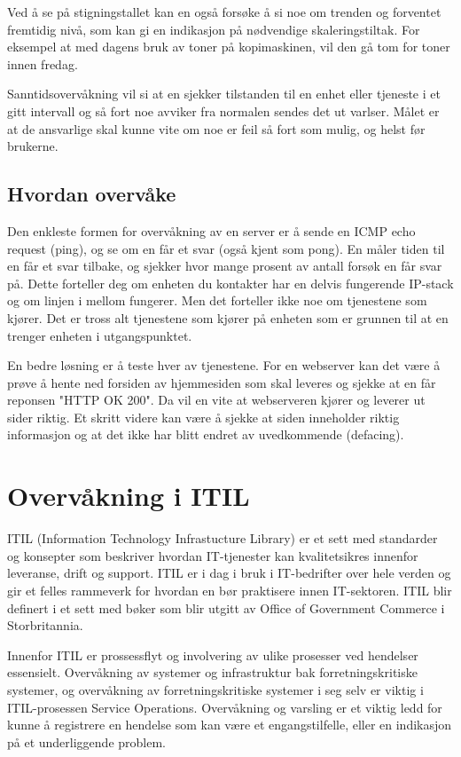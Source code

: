 Ved å se på stigningstallet kan en også forsøke å si noe om trenden og forventet fremtidig nivå, som kan gi en indikasjon på nødvendige skaleringstiltak. For eksempel at med dagens bruk av toner på kopimaskinen, vil den gå tom for toner innen fredag. 

Sanntidsovervåkning vil si at en sjekker tilstanden til en enhet eller tjeneste i et gitt intervall og så fort noe avviker fra normalen sendes det ut varlser. Målet er at de ansvarlige skal kunne vite om noe er feil så fort som mulig, og helst før brukerne.

\subsection{Hvordan overvåke}
Den enkleste formen for overvåkning av en server er å sende en ICMP echo request (ping), og se om en får et svar (også kjent som pong). En måler tiden til en får et svar tilbake, og sjekker hvor mange prosent av antall forsøk en får svar på. Dette forteller deg om enheten du kontakter har en delvis fungerende IP-stack og om linjen i mellom fungerer. Men det forteller ikke noe om tjenestene som kjører. Det er tross alt tjenestene som kjører på enheten som er grunnen til at en trenger enheten i utgangspunktet.

En bedre løsning er å teste hver av tjenestene. For en webserver kan det være å prøve å hente ned forsiden av hjemmesiden som skal leveres og sjekke at en får reponsen "HTTP OK 200". Da vil en vite at webserveren kjører og leverer ut sider riktig. Et skritt videre kan være å sjekke at siden inneholder riktig informasjon og at det ikke har blitt endret av uvedkommende (defacing).

\section{Overvåkning i ITIL}
ITIL (Information Technology Infrastucture Library) er et sett med standarder og konsepter som beskriver hvordan IT-tjenester kan kvalitetsikres innenfor leveranse, drift og support. ITIL er i dag i bruk i IT-bedrifter over hele verden og gir et felles rammeverk for hvordan en bør praktisere innen IT-sektoren. ITIL blir definert i et sett med bøker som blir utgitt av Office of Government Commerce i Storbritannia.

Innenfor ITIL er prossessflyt og involvering av ulike prosesser ved hendelser essensielt. Overvåkning av systemer og infrastruktur bak forretningskritiske systemer, og overvåkning av forretningskritiske systemer i seg selv er viktig i ITIL-prosessen Service Operations. Overvåkning og varsling er et viktig ledd for kunne å registrere en hendelse som kan være et engangstilfelle, eller en indikasjon på et underliggende problem. 


